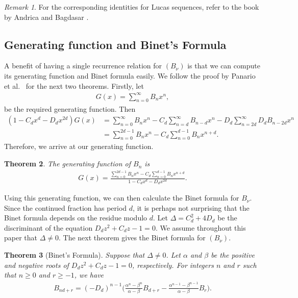 \documentclass[12pt]{article}
\theoremstyle{plain}
\newtheorem{theorem}{Theorem}
\theoremstyle{definition}
\theoremstyle{remark}
\newtheorem{remark}[theorem]{Remark}
\begin{document}
\begin{remark} For the corresponding identities for Lucas sequences, refer to the book by Andrica and Bagdasar \cite{Andrica_Bagdasar_20}.	
\end{remark}

\subsection{Generating function and Binet's Formula} \label{Sec:Generating_Function_and_Binet's_Formula}

A benefit of having a single recurrence relation for $ (B_\nu) $ is that we can compute its generating function and Binet formula easily. We follow the proof by Panario et al.\ \cite{Panario_Sahin_Wang_13} for the next two theorems. Firstly, let 
\begin{align*}
	G(x) = \sum_{n = 0}^\infty B_n x^n,
\end{align*}
be the required generating function. Then
\begin{align*}
	(1 - C_d x^d - D_d x^{2d}) G(x) &= \sum_{n = 0}^\infty B_n x^n - C_d \sum_{n = d}^\infty B_{n - d} x^n - D_d \sum_{n = 2d}^\infty D_d B_{n - 2d} x^n \\
	&= \sum_{n = 0}^{2d - 1} B_n x^n - C_d \sum_{n = 0}^{d - 1} B_n x^{n + d}.
\end{align*}
Therefore, we arrive at our generating function.
\begin{theorem} The generating function of $ B_n $ is 
\begin{align*}
	G(x) = \frac{\sum\limits_{n = 0}^{2d - 1} B_n x^n - C_d \sum\limits_{n = 0}^{d - 1} B_n x^{n + d}}{1 - C_d x^d - D_d x^{2d}}.
\end{align*}
\end{theorem}

Using this generating function, we can then calculate the Binet formula for $ B_\nu $. Since the continued fraction has period $ d $, it is perhaps not surprising that the Binet formula depends on the residue modulo $ d $. Let $ \Delta = C_d^2 + 4D_d $ be the discriminant of the equation $ D_d z^2 + C_d z - 1 = 0 $. We assume throughout this paper that $ \Delta \neq 0 $. The next theorem gives the Binet formula for $ (B_\nu) $.
\begin{theorem}[Binet's Formula] \label{Th:Binet_Formula} Suppose that $ \Delta \neq 0 $. Let $ \alpha $ and $ \beta $ be the positive and negative roots of $ D_d z^2 + C_d z - 1 = 0 $, respectively. For integers $ n $ and $ r $ such that $ n \geq 0 $ and $ r \geq -1 $, we have
\begin{align*}
	B_{nd + r} = (-D_d)^{n - 1} \bigg( \frac{\alpha^n - \beta^n}{\alpha - \beta} B_{d + r} - \frac{\alpha^{n - 1} - \beta^{n - 1}}{\alpha - \beta} B_r \bigg).
\end{align*}
\end{theorem}
\end{document}
